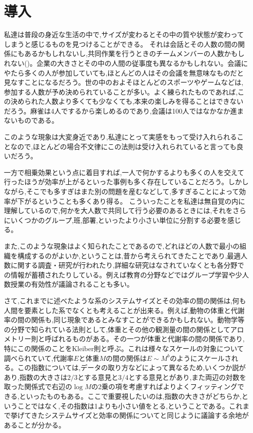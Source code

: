 \chapter{導入}

私達は普段の身近な生活の中で,サイズが変わるとその中の質や状態が変わってしまうと感じるものを見つけることができる。
それは会話とその人数の間の関係にもあるかもしれないし,共同作業を行うときのチームメンバーの人数かもしれない(\cite{kaigi4})。企業の大きさとその中の人間の従事度も異なるかもしれない。会議にやたら多くの人が参加していても,ほとんどの人はその会議を無意味なものだと見なすことになるだろう。世の中のおよそほとんどのスポーツやゲームなどは,参加する人数が予め決められていることが多い。よく練られたものであれば,この決められた人数より多くても少なくても,本来の楽しみを得ることはできないだろう。麻雀は4人でするから楽しめるのであり,会議は100人ではなかなか進まないものである。

このような現象は大変身近であり,私達にとって実感をもって受け入れられることなので,ほとんどの場合不文律にこの法則は受け入れられていると言っても良いだろう。

一方で相乗効果という点に着目すれば,一人で何かするよりも多くの人を交えて行ったほうが効率が上がるといった事例も多く存在していることだろう。しかしながら,そこでも多すぎはまた別の問題を産むなどして,多すぎることによって効率が下がるということも多くあり得る。
こういったことを私達は無自覚の内に理解しているので,何かを大人数で共同して行う必要のあるときには,それをさらにいくつかのグループ,班,部署,といったより小さい単位に分割する必要を感じる。

また,このような現象はよく知られたことであるので,どれほどの人数で最小の組織を構成するのがよいか,ということは,昔から考えられてきたことであり,最適人数に関する調査・研究が行われたり,詳細な研究はなされていなくとも各分野での情報が蓄積されたりしている。例えば教育の分野などではグループ学習や少人数授業の有効性が議論されることも多い。

さて,これまでに述べたような系のシステムサイズとその効率の間の関係は,何も人間を要素とした系でなくとも考えることが出来る。例えば,動物の体重と代謝率の間の関係も,同じ現象であるとみなすことができるかもしれない。動物学等の分野で知られている法則として,体重とその他の観測量の間の関係としてアロメトリー則と呼ばれるものがある。その一つが体重と代謝率の間の関係であり,特にこの関係のことをKleiber則と呼ぶ。これは様々なスケールの対象について調べられていて,代謝率$E$と体重$M$の間の関係は$E\sim M^{b}$のようにスケールされる。この指数については,データの取り方などによって異なるため,いくつか説があり,指数の大きさは$2/3$とする意見と$3/4$とする意見とがあり,また両辺の対数を取った関係式で右辺の$\log M$の2乗の項を考慮すればよりよくフィッティングできる,といったものもある。ここで重要視したいのは,指数の大きさがどちらか,ということではなく,その指数は1よりも小さい値をとる,ということである。これまで挙げてきたシステムサイズと効率の関係についてと同じように議論する余地があることが分かる。

